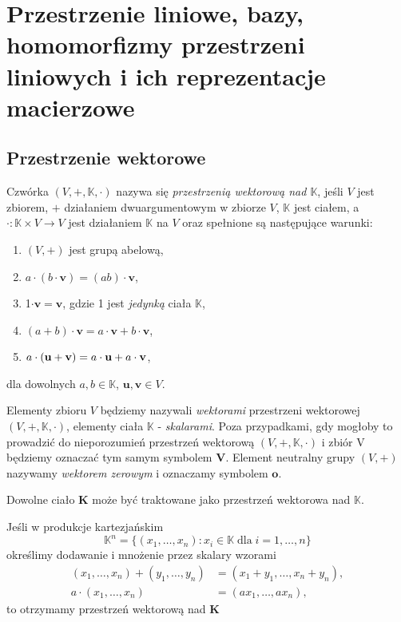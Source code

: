 \chapter{Przestrzenie liniowe, bazy, homomorfizmy przestrzeni liniowych i ich reprezentacje macierzowe}
\section{Przestrzenie wektorowe}
	\begin{df}
		Czwórka $(V, +, \mathbb{K}, \cdot)$ nazywa się \textit{przestrzenią wektorową nad $\mathbb{K}$}, jeśli $V$ jest zbiorem, $+$ działaniem dwuargumentowym w zbiorze $V$, $\mathbb{K}$ jest ciałem, a $\cdot: \mathbb{K} \times V \to V$ jest działaniem $\mathbb{K}$ na $V$ oraz spełnione są następujące warunki:
		\begin{enumerate}
			\item $(V, +)$ jest grupą abelową,
			\item $a \cdot (b \cdot \textbf{v}) = (ab) \cdot \textbf{v}$,
			\item 1$ \cdot \textbf{v} =  \textbf{v}$, gdzie 1 jest \textit{jedynką} ciała $\mathbb{K}$,
			\item $(a + b) \cdot \textbf{v} = a \cdot \textbf{v} + b \cdot \textbf{v}$,
			\item $a \cdot (\textbf{u} + \textbf{\textbf{v}}) =  a \cdot \textbf{u} + a \cdot \textbf{v}$,
		\end{enumerate}
		dla dowolnych $a,b \in \mathbb{K}$, $\textbf{u}, \textbf{v} \in V$.
	\end{df}
	\begin{uwg}
		Elementy zbioru $V$ będziemy nazywali \textit{wektorami} przestrzeni wektorowej  $(V, +, \mathbb{K}, \cdot)$,
		elementy ciała $\mathbb{K}$ - \textit{skalarami}. Poza przypadkami, gdy mogłoby to prowadzić do nieporozumień przestrzeń wektorową $(V, +, \mathbb{K}, \cdot)$ i zbiór V będziemy oznaczać tym samym symbolem \textbf{V}. Element neutralny grupy $(V, +)$ nazywamy \textit{wektorem zerowym} i oznaczamy symbolem $\textbf{o}$.
	\end{uwg}
	
	\begin{przyk}
		Dowolne ciało $\textbf{K}$ może być traktowane jako przestrzeń wektorowa nad $\mathbb{K}$.
	\end{przyk}

	\begin{przyk}
		Jeśli w produkcje kartezjańskim
		\begin{equation*}
			\mathbb{K}^n = \{(x_1, \ldots, x_n) : x_i \in \mathbb{K} \; \text{dla} \; i = 1, \ldots, n  \}
		\end{equation*}
		określimy dodawanie i mnożenie przez skalary wzorami 
		\begin{align}
			(x_1, \ldots, x_n)  + (y_1, \ldots, y_n)  &= (x_1 + y_1, \ldots, x_n + y_n), \\
			a \cdot (x_1, \ldots, x_n)  &= (ax_1, \ldots, ax_n),
		\end{align} 
		to otrzymamy przestrzeń wektorową nad $\textbf{K}$
	\end{przyk}
	
